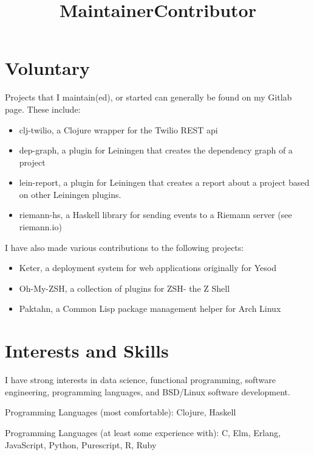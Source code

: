 \documentclass[margintitle,line]{res}
\renewcommand{\subsection}[1]{\section{\normalfont #1}}
\begin{document}
\begin{resume}
%
\subsection{Voluntary}

\title{Maintainer}
\begin{position}
Projects that I maintain(ed), or started can generally be found on my
Gitlab page. These include:
\begin{itemize}
\item{clj-twilio, a Clojure wrapper for the Twilio REST api}
\item{dep-graph, a plugin for Leiningen that creates the dependency
    graph of a project}
\item{lein-report, a plugin for Leiningen that creates a report about
  a project based on other Leiningen plugins.}
\item{riemann-hs, a Haskell library for sending events to a Riemann
  server (see riemann.io)}
\end{itemize}
\end{position}

\title{Contributor}
\begin{position}
I have also made various contributions to the following projects:
\begin{itemize}
\item{Keter, a deployment system for web applications originally for Yesod}
\item{Oh-My-ZSH, a collection of plugins for ZSH- the Z Shell}
\item{Paktahn, a Common Lisp package management helper for Arch Linux}
\end{itemize}
\end{position}



\section{Interests and Skills}

I have strong interests in data science, functional programming,
software engineering, programming languages, and BSD/Linux software development.

Programming Languages (most comfortable): Clojure, Haskell

Programming Languages (at least some experience with): C, Elm, Erlang, JavaScript, Python, Purescript, R, Ruby


\end{resume}
\end{document}
